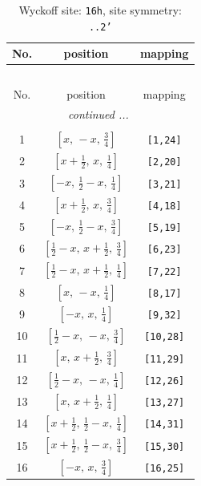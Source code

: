\documentclass[fleqn,8pt]{jsarticle}
\begin{document}
\renewcommand{\arraystretch}{1.2}
\begin{longtable}{ccc}
\caption{Wyckoff site: {\tt 16h}, site symmetry: {\tt ..2'}}
 \\
 \hline \hline
No. & position & mapping \\ \hline \endfirsthead

\multicolumn{2}{l}{\tablename\ \thetable{}} \\
 \hline \hline
No. & position & mapping \\ \hline \endhead

 \hline \hline
\multicolumn{2}{r}{\footnotesize\it continued ...} \\ \endfoot

 \hline \hline
\multicolumn{2}{r}{} \\ \endlastfoot

1 & $\left[ x,\, - x,\, \frac{3}{4} \right]$ & {\tt [1,24]} \\ \hline
2 & $\left[ x + \frac{1}{2},\, x,\, \frac{1}{4} \right]$ & {\tt [2,20]} \\ \hline
3 & $\left[ - x,\, \frac{1}{2} - x,\, \frac{1}{4} \right]$ & {\tt [3,21]} \\ \hline
4 & $\left[ x + \frac{1}{2},\, x,\, \frac{3}{4} \right]$ & {\tt [4,18]} \\ \hline
5 & $\left[ - x,\, \frac{1}{2} - x,\, \frac{3}{4} \right]$ & {\tt [5,19]} \\ \hline
6 & $\left[ \frac{1}{2} - x,\, x + \frac{1}{2},\, \frac{3}{4} \right]$ & {\tt [6,23]} \\ \hline
7 & $\left[ \frac{1}{2} - x,\, x + \frac{1}{2},\, \frac{1}{4} \right]$ & {\tt [7,22]} \\ \hline
8 & $\left[ x,\, - x,\, \frac{1}{4} \right]$ & {\tt [8,17]} \\ \hline
9 & $\left[ - x,\, x,\, \frac{1}{4} \right]$ & {\tt [9,32]} \\ \hline
10 & $\left[ \frac{1}{2} - x,\, - x,\, \frac{3}{4} \right]$ & {\tt [10,28]} \\ \hline
11 & $\left[ x,\, x + \frac{1}{2},\, \frac{3}{4} \right]$ & {\tt [11,29]} \\ \hline
12 & $\left[ \frac{1}{2} - x,\, - x,\, \frac{1}{4} \right]$ & {\tt [12,26]} \\ \hline
13 & $\left[ x,\, x + \frac{1}{2},\, \frac{1}{4} \right]$ & {\tt [13,27]} \\ \hline
14 & $\left[ x + \frac{1}{2},\, \frac{1}{2} - x,\, \frac{1}{4} \right]$ & {\tt [14,31]} \\ \hline
15 & $\left[ x + \frac{1}{2},\, \frac{1}{2} - x,\, \frac{3}{4} \right]$ & {\tt [15,30]} \\ \hline
16 & $\left[ - x,\, x,\, \frac{3}{4} \right]$ & {\tt [16,25]} \\
\end{longtable}
\end{document}
